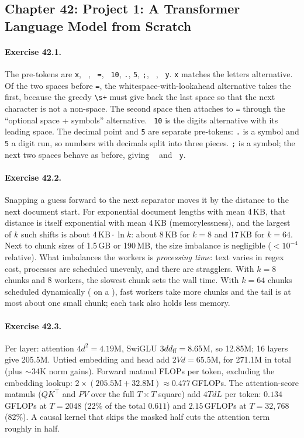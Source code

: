 \subsection*{Chapter 42: Project 1: A Transformer Language Model from Scratch}

\paragraph{Exercise 42.1.} The pre-tokens are \verb*|x|, \verb*| |, \verb*| =|, \verb*| 10|,
\verb*|.|, \verb*|5|, \verb*|;|, \verb*| |, \verb*| y|. \verb*|x| matches the letters alternative.
Of the two spaces before \texttt{=}, the whitespace-with-lookahead alternative takes the first,
because the greedy \verb|\s+| must give back the last space so that the next character is not a
non-space. The second space then attaches to \texttt{=} through the ``optional space +
symbols'' alternative. \verb*| 10| is the digits alternative with its leading space. The decimal
point and \texttt{5} are separate pre-tokens: \texttt{.} is a symbol and \texttt{5} a digit run,
so numbers with decimals split into three pieces. \texttt{;} is a symbol; the next two spaces
behave as before, giving \verb*| | and \verb*| y|.

\paragraph{Exercise 42.2.} Snapping a guess forward to the next separator moves it by the
distance to the next document start. For exponential document lengths with mean 4\,KB, that
distance is itself exponential with mean 4\,KB (memorylessness), and the largest of $k$ such
shifts is about $4\,\text{KB}\cdot\ln k$: about 8\,KB for $k=8$ and 17\,KB for $k=64$. Next to chunk
sizes of 1.5\,GB or 190\,MB, the size imbalance is negligible ($<10^{-4}$ relative). What
imbalances the workers is \emph{processing time}: text varies in regex cost, processes are
scheduled unevenly, and there are stragglers. With $k=8$ chunks and 8 workers, the slowest chunk
sets the wall time. With $k=64$ chunks scheduled dynamically ( on a
), fast workers take more chunks and the tail is at most about one small chunk; each
task also holds less memory.

\paragraph{Exercise 42.3.} Per layer: attention $4d^2=4.19$M, SwiGLU $3dd_{\text{ff}}=8.65$M, so
12.85M; 16 layers give 205.5M. Untied embedding and head add $2Vd=65.5$M, for 271.1M in total
(plus $\sim$34K norm gains). Forward matmul FLOPs per token, excluding the embedding lookup:
$2\times(205.5\text{M}+32.8\text{M})\approx0.477$\,GFLOPs. The attention-score matmuls ($QK^\top$
and $PV$ over the full $T\times T$ square) add $4TdL$ per token: $0.134$\,GFLOPs at $T=2048$
(22\% of the total $0.611$) and $2.15$\,GFLOPs at $T=32{,}768$ (82\%). A causal kernel that
skips the masked half cuts the attention term roughly in half.

